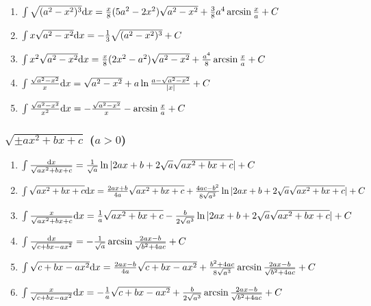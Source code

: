 \begin{tiny}
\begin{enumerate}[noitemsep]
\item $ \int \sqrt{(a^2-x^2)^3}\mathrm{d} x = \frac{x}{8}(5a^2-2x^2)\sqrt{a^2-x^2}+\frac{3}{8}a^4\arcsin\frac{x}{a} + C $

\item $ \int x\sqrt{a^2-x^2}\mathrm{d} x = -\frac{1}{3}\sqrt{(a^2-x^2)^3} + C $

\item $ \int x^2\sqrt{a^2-x^2}\mathrm{d} x = \frac{x}{8}(2x^2-a^2)\sqrt{a^2-x^2}+\frac{a^4}{8}\arcsin\frac{x}{a} + C $

\item $ \int \frac{\sqrt{a^2-x^2}}{x}\mathrm{d} x = \sqrt{a^2-x^2} + a \ln \frac{a-\sqrt{a^2-x^2}}{|x|} + C $

\item $ \int \frac{\sqrt{a^2-x^2}}{x^2} \mathrm{d} x = -\frac{\sqrt{a^2-x^2}}{x} - \arcsin\frac{x}{a} + C $

\end{enumerate}

\subsubsection{$\sqrt{\pm ax^2+bx+c}$ ($a>0$)}

\begin{enumerate}[noitemsep]

\item $ \int \frac{\mathrm{d} x}{\sqrt{ax^2+bx+c}} = \frac{1}{\sqrt{a}} \ln | 2ax+b+2\sqrt{a}\sqrt{ax^2+bx+c} | + C $

\item $ \int \sqrt{ax^2+bx+c} \mathrm{d} x = \frac{2ax+b}{4a}\sqrt{ax^2+bx+c} +
	\frac{4ac-b^2}{8\sqrt{a^3}}\ln |2ax+b+2\sqrt{a}\sqrt{ax^2+bx+c}| + C $

\item $ \int \frac{x}{\sqrt{ax^2+bx+c}} \mathrm{d} x = \frac{1}{a}\sqrt{ax^2+bx+c} -
	\frac{b}{2\sqrt{a^3}}\ln | 2ax+b+2\sqrt{a}\sqrt{ax^2+bx+c} | + C $

\item $ \int \frac{\mathrm{d} x}{\sqrt{c+bx-ax^2}} = -\frac{1}{\sqrt{a}} \arcsin \frac{2ax-b}{\sqrt{b^2+4ac}} + C  $

\item $ \int \sqrt{c+bx-ax^2} \mathrm{d} x = \frac{2ax-b}{4a}\sqrt{c+bx-ax^2} + \\
	\frac{b^2+4ac}{8\sqrt{a^3}}\arcsin\frac{2ax-b}{\sqrt{b^2+4ac}} + C $

\item $ \int \frac{x}{\sqrt{c+bx-ax^2}} \mathrm{d} x = -\frac{1}{a}\sqrt{c+bx-ax^2} + \frac{b}{2\sqrt{a^3}}\arcsin\frac{2ax-b}{\sqrt{b^2+4ac}} + C $


\end{enumerate}
\end{tiny}

